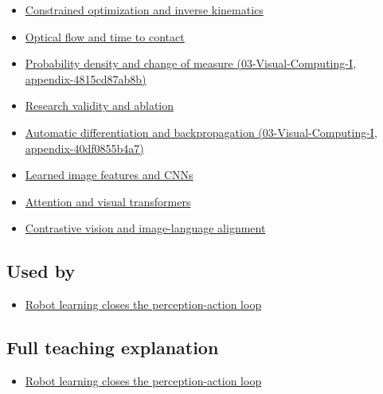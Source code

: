 \begin{itemize}
\tightlist
\item
  \hyperref[appendix-29f4bea4c2bb]{Constrained optimization and inverse kinematics}
\item
  \hyperref[appendix-e2e73f8cd93e]{Optical flow and time to contact}
\item
  \href{}{Probability density and change of measure (03-Visual-Computing-I, appendix-4815cd87ab8b)}
\item
  \hyperref[appendix-65788587ef78]{Research validity and ablation}
\item
  \href{}{Automatic differentiation and backpropagation (03-Visual-Computing-I, appendix-40df0855b4a7)}
\item
  \hyperref[appendix-47c51ea026fb]{Learned image features and CNNs}
\item
  \hyperref[appendix-a9d5dfdd164a]{Attention and visual transformers}
\item
  \hyperref[appendix-772f1fd96148]{Contrastive vision and image-language alignment}
\end{itemize}

\subsection{Used by}\label{used-by}

\begin{itemize}
\tightlist
\item
  \href{Continuous\%20Notes/University\%20-\%20Worlds,\%20Images\%20and\%20Inference\%20-\%20Graphics,\%20Vision\%20and\%20Photography\#Robot\%20learning\%20closes\%20the\%20perception-action\%20loop}{Robot learning closes the perception-action loop}
\end{itemize}

\subsection{Full teaching explanation}\label{full-teaching-explanation}

\begin{itemize}
\tightlist
\item
  \href{Continuous\%20Notes/University\%20-\%20Worlds,\%20Images\%20and\%20Inference\%20-\%20Graphics,\%20Vision\%20and\%20Photography\#Robot\%20learning\%20closes\%20the\%20perception-action\%20loop}{Robot learning closes the perception-action loop}
\end{itemize}


